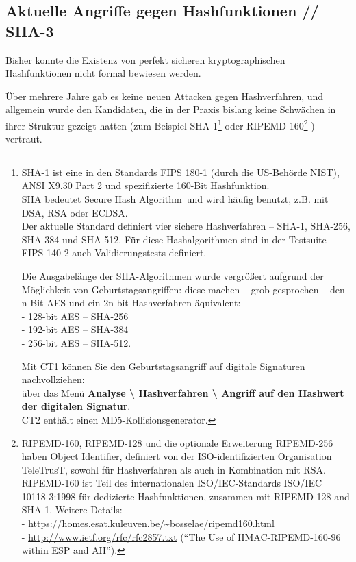 \begin{refsegment}
\subsection{Aktuelle Angriffe gegen Hashfunktionen // SHA-3}
\label{collision-attacks-against-sha-1}

Bisher konnte die Existenz von perfekt sicheren kryptographischen
Hashfunktionen nicht formal bewiesen werden.

Über mehrere Jahre gab es keine neuen Attacken gegen Hashverfahren,
und allgemein wurde den Kandidaten, die in der Praxis bislang keine
Schwächen in ihrer Struktur gezeigt hatten
(zum Beispiel  SHA-1\footnote{%
  SHA-1  ist eine in den Standards FIPS 180-1 (durch die
  US-Behörde NIST), ANSI X9.30 Part 2 und
  \cite{FIPS186} spezifizierte 160-Bit Hashfunktion.\\
  SHA bedeutet \glqq Secure Hash Algorithm\grqq~und wird häufig benutzt, z.B.
  mit DSA, RSA oder ECDSA.\\
  Der aktuelle Standard \cite{FIPS180} definiert vier sichere Hashverfahren
  -- SHA-1, SHA-256, SHA-384 und SHA-512.
  Für diese Hashalgorithmen sind in der Testsuite FIPS 140-2 auch
  Validierungstests definiert.

  Die Ausgabelänge der SHA-Algorithmen wurde vergrößert aufgrund der
  Möglichkeit von Geburtstagsangriffen:
   
  diese machen -- grob gesprochen -- den n-Bit AES und ein 2n-bit
  Hashverfahren äquivalent:\\
  - 128-bit AES -- SHA-256\\
  - 192-bit AES -- SHA-384\\
  - 256-bit AES -- SHA-512.

  Mit CT1 können Sie den Geburtstagsangriff
   auf digitale Signaturen
  nachvollziehen:\\
  über das Menü \textbf{Analyse \textbackslash{} Hashverfahren
  \textbackslash{} Angriff auf den Hashwert der digitalen Signatur}.\\
  CT2 enthält einen MD5-Kollisionsgenerator.
  }
oder  RIPEMD-160\footnote{%
  RIPEMD-160, RIPEMD-128 und die optionale Erweiterung RIPEMD-256 haben
  Object Identifier, definiert von der ISO-identifizierten Organisation
  TeleTrusT, sowohl für Hashverfahren als auch in Kombination mit RSA.
  RIPEMD-160 ist Teil des internationalen ISO/IEC-Standards
  ISO/IEC 10118-3:1998 für dedizierte Hashfunktionen, zusammen mit
  RIPEMD-128 and SHA-1. Weitere Details:\\
- \url{https://homes.esat.kuleuven.be/~bosselae/ripemd160.html}\\
- \url{http://www.ietf.org/rfc/rfc2857.txt} (``The Use of HMAC-RIPEMD-160-96
   within ESP and AH'').
  }%
) vertraut.


\end{refsegment}
